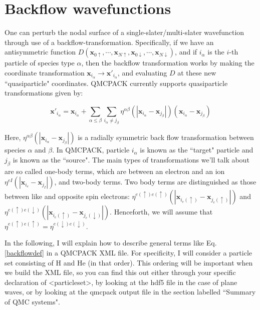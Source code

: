 \section{Backflow wavefunctions}

\label{sec:backflow}

One can perturb the nodal surface of a single-slater/multi-slater wavefunction through use of a backflow-transformation.  Specifically, if we have an antisymmetric function $D(\mathbf{x}_{0\uparrow},\cdots,\mathbf{x}_{N\uparrow}, \mathbf{x}_{0\downarrow},\cdots,\mathbf{x}_{N\downarrow})$, and if $i_\alpha$ is the $i$-th particle of species type $\alpha$, then the backflow transformation works by making the coordinate transformation $\mathbf{x}_{i_\alpha} \to \mathbf{x}'_{i_\alpha}$, and evaluating $D$ at these new ``quasiparticle" coordinates.  QMCPACK currently supports quasiparticle transformations given by:

\begin{equation}\label{backflowdef}
\mathbf{x}'_{i_\alpha}=\mathbf{x}_{i_\alpha}+\sum_{\alpha \leq \beta} \sum_{i_\alpha \neq j_\beta} \eta^{\alpha\beta}(|\mathbf{x}_{i_\alpha}-\mathbf{x}_{j_\beta}|)(\mathbf{x}_{i_\alpha}-\mathbf{x}_{j_\beta})
\end{equation}

Here, $\eta^{\alpha\beta}(|\mathbf{x}_{i_\alpha}-\mathbf{x}_{j_\beta}|)$ is a radially symmetric back flow transformation between species $\alpha$ and $\beta$.  In QMCPACK, particle $i_\alpha$ is known as the ``target" particle and $j_\beta$ is known as the ``source".  The main types of transformations we'll talk about are so called one-body terms, which are between an electron and an ion $\eta^{eI}(|\mathbf{x}_{i_e}-\mathbf{x}_{j_I}|)$, and two-body terms.  Two body terms are distinguished as those between like and opposite spin electrons:  $\eta^{e(\uparrow)e(\uparrow)}(|\mathbf{x}_{i_e(\uparrow)}-\mathbf{x}_{j_e(\uparrow)}|)$ and  $\eta^{e(\uparrow)e(\downarrow)}(|\mathbf{x}_{i_e(\uparrow)}-\mathbf{x}_{j_e(\downarrow)}|)$.  Henceforth, we will assume that $\eta^{e(\uparrow)e(\uparrow)}=\eta^{e(\downarrow)e(\downarrow)}$.

In the following, I will explain how to describe general terms like Eq. \ref{backflowdef} in a QMCPACK XML file.  For specificity, I will consider a particle set consisting of H and He (in that order).  This ordering will be important when we build the XML file, so you can find this out either through your specific declaration of <particleset>, by looking at the hdf5 file in the case of plane waves, or by looking at the qmcpack output file in the section labelled ``Summary of QMC systems".  
